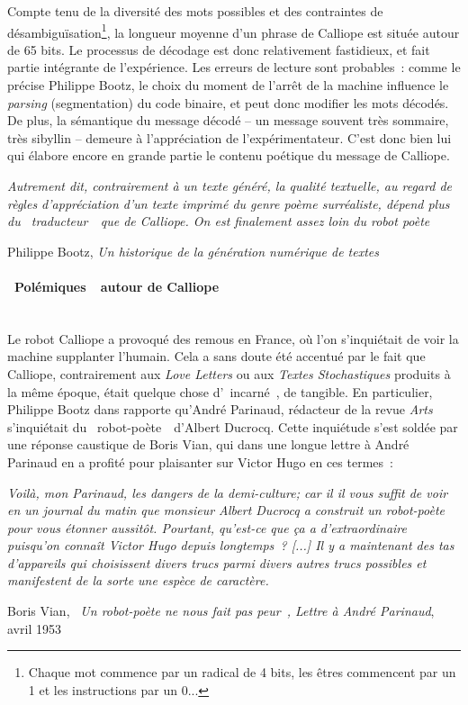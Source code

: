\documentclass{article}
\newcommand{\subsubsubsection}[1]{\paragraph{#1}\mbox{}\\}
\newenvironment{citationbox}
{\begin{center}
		\begin{minipage}{.8\textwidth}
		}
		{
		\end{minipage}	
\end{center}
}
\begin{document}
					\vspace{2mm}
					Compte tenu de la diversité des mots possibles et des contraintes de désambiguïsation\footnote{Chaque mot commence par un radical de 4 bits, les êtres commencent par un 1 et les instructions par un 0...}, la longueur moyenne d'un phrase de Calliope est située autour de 65 bits. Le processus de décodage est donc relativement fastidieux, et fait partie intégrante de l'expérience. Les erreurs de lecture sont probables~: comme le précise Philippe Bootz, le choix du moment de l'arrêt de la machine influence le \textit{parsing} (segmentation) du code binaire, et peut donc modifier les mots décodés. De plus, la sémantique du message décodé -- un message souvent très sommaire, très sibyllin -- demeure à l'appréciation de l'expérimentateur. C'est donc bien lui qui élabore encore en grande partie le contenu poétique du message de Calliope.
					\begin{citationbox}
						\textit{Autrement dit, contrairement à
						un texte généré, la qualité textuelle, au regard de règles d'appréciation d'un texte
						imprimé du genre poème surréaliste, dépend plus du \guillemotleft~traducteur~\guillemotright~que de
						Calliope. On est finalement assez loin du robot poète}
					\begin{flushright}
						Philippe Bootz, \textit{Un historique de la génération numérique de textes} \autocite{bootz}
					\end{flushright}
					\end{citationbox}
				\subsubsubsection{\guillemotleft~Polémiques~\guillemotright~autour de Calliope}
					Le robot Calliope a provoqué des remous en France, où l'on s'inquiétait de voir la machine supplanter l'humain. Cela a sans doute été accentué par le fait que Calliope, contrairement aux \textit{Love Letters} ou aux \textit{Textes Stochastiques} produits à la même époque, était quelque chose d'\guillemotleft~incarné~\guillemotright, de tangible. En particulier, Philippe Bootz dans \autocite{bootz} rapporte qu'André Parinaud, rédacteur de la revue \textit{Arts} s'inquiétait du \guillemotleft~robot-poète~\guillemotright~d'Albert Ducrocq. Cette inquiétude s'est soldée par une réponse caustique de Boris Vian, qui dans une longue lettre à André Parinaud en a profité pour plaisanter sur Victor Hugo en ces termes~:
					\begin{citationbox}
						\textit{Voilà, mon Parinaud, les dangers de la demi-culture; car il il vous suffit de voir en un journal du matin que monsieur Albert Ducrocq a construit un robot-poète pour vous étonner aussitôt. Pourtant, qu'est-ce que ça a d'extraordinaire puisqu'on connaît Victor Hugo depuis longtemps~? [...] Il y a maintenant des tas d'appareils qui choisissent divers trucs parmi divers autres trucs possibles et manifestent de la sorte une espèce de caractère.}
						\begin{flushright}
							Boris Vian, \textit{\guillemotleft~Un robot-poète ne nous fait pas peur~\guillemotright, Lettre à André Parinaud}, avril 1953  \autocite{vian1953}
						\end{flushright}
					\end{citationbox}
					
\end{document}
